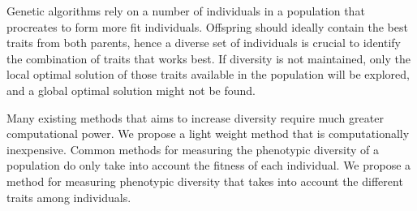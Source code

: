 Genetic algorithms rely on a number of individuals in a population that procreates to form more fit individuals. Offspring should ideally contain the best traits from both parents, hence a diverse set of individuals is crucial to identify the combination of traits that works best. If diversity is not maintained, only the local optimal solution of those traits available in the population will be explored, and a global optimal solution might not be found.
\cite{ursem2002diversity}

Many existing methods that aims to increase diversity require much greater computational power.
We propose a light weight method that is computationally inexpensive.
Common methods for measuring the phenotypic diversity of a population do only take into account the fitness of each individual.
We propose a method for measuring phenotypic diversity that takes into account the different traits among individuals.